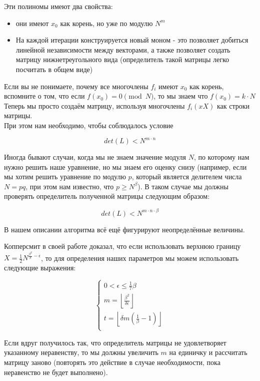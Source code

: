 \documentclass[12pt,a4paper]{scrartcl}
\begin{document}
Эти полиномы имеют два свойства:
\begin{itemize}
	\item они имеют $x_0$ как корень, но уже по модулю $N^m$
	\item На каждой итерации конструируется новый моном - это позволяет добиться линейной независимости между векторами, а также позволяет создать матрицу нижнетреугольного вида (определитель такой матрицы легко посчитать в общем виде)
\end{itemize}

Если вы не понимаете, почему все многочлены $f_i$ имеют $x_0$ как корень, вспомните о том, что если $f(x_0) = 0 \pmod{N}$, то мы знаем что $f(x_0) = k \cdot N$\\

Теперь мы просто создаём матрицу, используя многочлены $f_i(xX)$ как строки матрицы.\\

При этом нам необходимо, чтобы соблюдалось условие

$$det(L) < N^{m \cdot n}$$

Иногда бывают случаи, когда мы не знаем значение модуля $N$, по которому нам нужно решить наше уравнение, но мы знаем его оценку снизу (например, если мы хотим решить уравнение по модулю $p$, который является делителем числа $N=pq$, при этом нам известно, что $p \geq N^\beta$). В таком случае мы должны проверять определитель полученной матрицы следующим образом:

$$det(L) < N^{m \cdot n \cdot \beta}$$


В нашем описании алгоритма всё ещё фигурируют неопределённые величины. 

Копперсмит в своей работе доказал, что если использовать верхнюю границу $X = \frac{1}{2} N^{\frac{\beta^2}{\delta}-\epsilon}$, то для определения наших параметров мы можем использовать следующие выражения:

\[ \begin{cases}
	0 < \epsilon \leq \frac{1}{7} \beta\\
	m = \left\lfloor \frac{\beta^2}{\delta \epsilon}\right\rfloor\\
	t = \left\lfloor \delta m (\frac{1}{\beta}-1)\right\rfloor\\
\end{cases} \]

Если вдруг получилось так, что определитель матрицы не удовлетворяет указанному неравенству, то мы должны увеличить $m$ на единичку и рассчитать матрицу заново (повторять это действие в случае необходимости, пока неравенство не будет выполнено).
\end{document}
